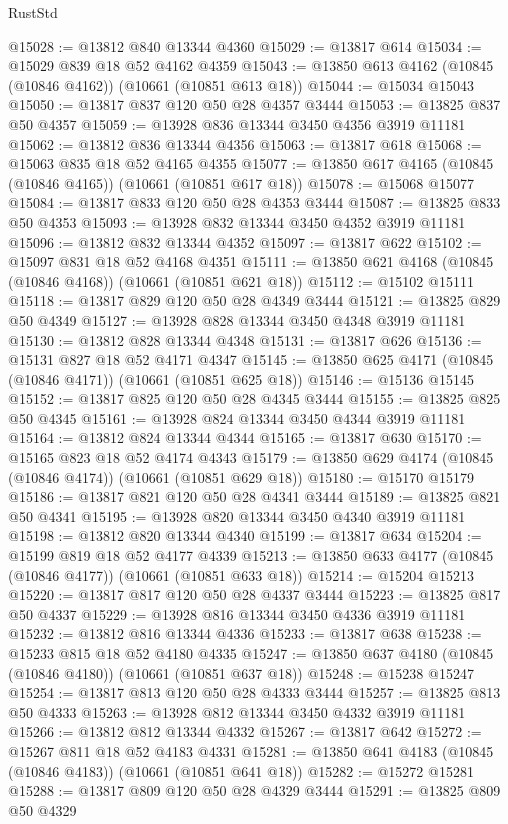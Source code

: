 \begin{lexlean}{RustStd}
\begin{coremodule}
@15028 := @13812 @840 @13344 @4360
@15029 := @13817 @614
@15034 := @15029 @839 @18 @52 @4162 @4359
@15043 := @13850 @613 @4162 (@10845 (@10846 @4162)) (@10661 (@10851 @613 @18))
@15044 := @15034 @15043
@15050 := @13817 @837 @120 @50 @28 @4357 @3444
@15053 := @13825 @837 @50 @4357
@15059 := @13928 @836 @13344 @3450 @4356 @3919 @11181
@15062 := @13812 @836 @13344 @4356
@15063 := @13817 @618
@15068 := @15063 @835 @18 @52 @4165 @4355
@15077 := @13850 @617 @4165 (@10845 (@10846 @4165)) (@10661 (@10851 @617 @18))
@15078 := @15068 @15077
@15084 := @13817 @833 @120 @50 @28 @4353 @3444
@15087 := @13825 @833 @50 @4353
@15093 := @13928 @832 @13344 @3450 @4352 @3919 @11181
@15096 := @13812 @832 @13344 @4352
@15097 := @13817 @622
@15102 := @15097 @831 @18 @52 @4168 @4351
@15111 := @13850 @621 @4168 (@10845 (@10846 @4168)) (@10661 (@10851 @621 @18))
@15112 := @15102 @15111
@15118 := @13817 @829 @120 @50 @28 @4349 @3444
@15121 := @13825 @829 @50 @4349
@15127 := @13928 @828 @13344 @3450 @4348 @3919 @11181
@15130 := @13812 @828 @13344 @4348
@15131 := @13817 @626
@15136 := @15131 @827 @18 @52 @4171 @4347
@15145 := @13850 @625 @4171 (@10845 (@10846 @4171)) (@10661 (@10851 @625 @18))
@15146 := @15136 @15145
@15152 := @13817 @825 @120 @50 @28 @4345 @3444
@15155 := @13825 @825 @50 @4345
@15161 := @13928 @824 @13344 @3450 @4344 @3919 @11181
@15164 := @13812 @824 @13344 @4344
@15165 := @13817 @630
@15170 := @15165 @823 @18 @52 @4174 @4343
@15179 := @13850 @629 @4174 (@10845 (@10846 @4174)) (@10661 (@10851 @629 @18))
@15180 := @15170 @15179
@15186 := @13817 @821 @120 @50 @28 @4341 @3444
@15189 := @13825 @821 @50 @4341
@15195 := @13928 @820 @13344 @3450 @4340 @3919 @11181
@15198 := @13812 @820 @13344 @4340
@15199 := @13817 @634
@15204 := @15199 @819 @18 @52 @4177 @4339
@15213 := @13850 @633 @4177 (@10845 (@10846 @4177)) (@10661 (@10851 @633 @18))
@15214 := @15204 @15213
@15220 := @13817 @817 @120 @50 @28 @4337 @3444
@15223 := @13825 @817 @50 @4337
@15229 := @13928 @816 @13344 @3450 @4336 @3919 @11181
@15232 := @13812 @816 @13344 @4336
@15233 := @13817 @638
@15238 := @15233 @815 @18 @52 @4180 @4335
@15247 := @13850 @637 @4180 (@10845 (@10846 @4180)) (@10661 (@10851 @637 @18))
@15248 := @15238 @15247
@15254 := @13817 @813 @120 @50 @28 @4333 @3444
@15257 := @13825 @813 @50 @4333
@15263 := @13928 @812 @13344 @3450 @4332 @3919 @11181
@15266 := @13812 @812 @13344 @4332
@15267 := @13817 @642
@15272 := @15267 @811 @18 @52 @4183 @4331
@15281 := @13850 @641 @4183 (@10845 (@10846 @4183)) (@10661 (@10851 @641 @18))
@15282 := @15272 @15281
@15288 := @13817 @809 @120 @50 @28 @4329 @3444
@15291 := @13825 @809 @50 @4329

\end{coremodule}
\end{lexlean}
